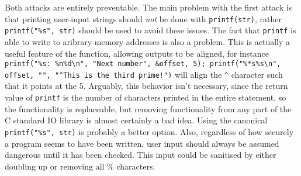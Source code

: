 Both attacks are entirely preventable. The main problem with the first attack is that printing user-input strings should \emph{not} be done with {\tt printf(str)}, rather {\tt printf("\%s", str)} should be used to avoid these issues. The fact that {\tt printf} is able to write to aribrary memory addresses is also a problem. This is actually a useful feature of the function, allowing outputs to be aligned, for instance {\tt printf("\%s: \%n\%d\textbackslash n", "Next number", \&offset, 5); printf("\%*s\%s\textbackslash n", offset, "", "\textasciicircum This is the third prime!")} will align the {\tt \textasciicircum} character such that it points at the 5. Arguably, this behavior isn't necessary, since the return value of {\tt printf} is the number of characters printed in the entire statement, so the functionality is replaceable, but removing functionality from any part of the C standard IO library is almost certainly a bad idea. Using the canonical {\tt printf("\%s", str)} is probably a better option. Also, regardless of how securely a program seems to have been written, user input should always be assumed dangerous until it has been checked. This input could be sanitised by either doubling up or removing all \% characters.